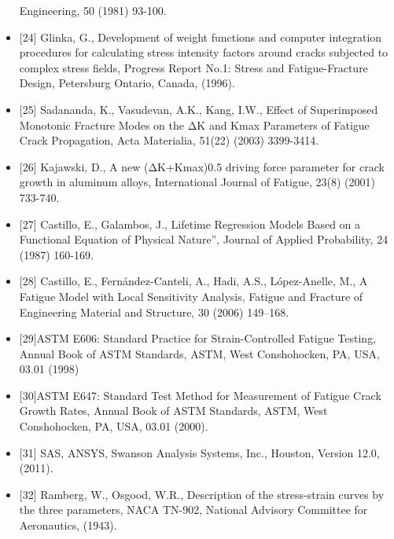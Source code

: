 \documentclass[11pt]{article}
\makeatletter
\newcommand{\boxspacing}{\kern\kvtcb@left@rule\kern\kvtcb@boxsep}
\newcommand{\prompt}[4]{
        \ttfamily\llap{{\color{#2}[#3]:\hspace{3pt}#4}}\vspace{-\baselineskip}
    }
\makeatother
\begin{document}
\begin{itemize}
  Engineering, 50 (1981) 93-100.
\item
  {[}24{]} Glinka, G., Development of weight functions and computer
  integration procedures for calculating stress intensity factors around
  cracks subjected to complex stress fields, Progress Report No.1:
  Stress and Fatigue-Fracture Design, Petersburg Ontario, Canada,
  (1996).
\item
  {[}25{]} Sadananda, K., Vasudevan, A.K., Kang, I.W., Effect of
  Superimposed Monotonic Fracture Modes on the ΔK and Kmax Parameters of
  Fatigue Crack Propagation, Acta Materialia, 51(22) (2003) 3399-3414.
\item
  {[}26{]} Kajawski, D., A new (ΔK+Kmax)0.5 driving force parameter for
  crack growth in aluminum alloys, International Journal of Fatigue,
  23(8) (2001) 733-740.
\item
  {[}27{]} Castillo, E., Galambos, J., Lifetime Regression Models Based
  on a Functional Equation of Physical Nature'', Journal of Applied
  Probability, 24 (1987) 160-169.
\item
  {[}28{]} Castillo, E., Fernández-Canteli, A., Hadi, A.S.,
  López-Anelle, M., A Fatigue Model with Local Sensitivity Analysis,
  Fatigue and Fracture of Engineering Material and Structure, 30 (2006)
  149--168.
\item
  {[}29{]}ASTM E606: Standard Practice for Strain-Controlled Fatigue
  Testing, Annual Book of ASTM Standards, ASTM, West Conshohocken, PA,
  USA, 03.01 (1998)
\item
  {[}30{]}ASTM E647: Standard Test Method for Measurement of Fatigue
  Crack Growth Rates, Annual Book of ASTM Standards, ASTM, West
  Conshohocken, PA, USA, 03.01 (2000).
\item
  {[}31{]} SAS, ANSYS, Swanson Analysis Systems, Inc., Houston, Version
  12.0, (2011).
\item
  {[}32{]} Ramberg, W., Osgood, W.R., Description of the stress-strain
  curves by the three parameters, NACA TN-902, National Advisory
  Committee for Aeronautics, (1943).
\end{itemize}

    \begin{tcolorbox}[breakable, size=fbox, boxrule=1pt, pad at break*=1mm,colback=cellbackground, colframe=cellborder]
\prompt{In}{incolor}{ }{\boxspacing}
\begin{Verbatim}[commandchars=\\\{\}]

\end{Verbatim}
\end{tcolorbox}


    
    
    
\end{document}
